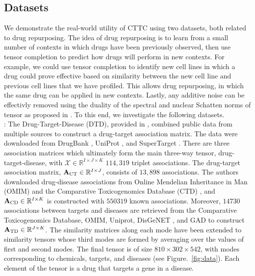 \documentclass{article}
\newcommand{\T}{\mathcal}
\newcommand{\m}[1]{{\bf{#1}}}
\newcommand{\mb}[1]{{\mathbb{#1}}}
\begin{document}
\subsection{Datasets}
We demonstrate the real-world utility of CTTC using two datasets, both related to drug repurposing. The idea of drug repurposing is to learn from a small number of contexts in which drugs have been previously observed, then use tensor completion to predict how drugs will perform in new contexts. For example, we could use tensor completion to identify new cell lines in which a drug could prove effective based on similarity between the new cell line and previous cell lines that we have profiled. This allows drug repurposing, in which the same drug can be applied in new contexts. Lastly, any additive noise can be effectivly removed using the duality of the spectral and nuclear Schatten norms of tensor as proposed in \cite{bagherian2024tensor}. To this end, we investigate the following datasets.\\
\noindent\textbf{}: The Drug-Target-Disease (DTD), provided in \cite{jamali2022ntd}, combined public data from multiple sources to construct a drug-target association matrix. The data were downloaded from DrugBank \cite{wishart2006drugbank}, UniProt \cite{uniprot2018uniprot}, and SuperTarget \cite{gunther2007supertarget}. There are three association matrices which ultimately form the main three-way tensor, drug-target-disease, with $\T X\in \mb R^{I\times J\times K}$
$114,319$ triplet associations. The drug-target association matrix, $\m A_{\text{CT}}\in \mathbb R^{I\times J}$, consists of $13,898$ associations. The authors downloaded drug-disease associations from Online Mendelian Inheritance in Man (OMIM) \cite{amberger2019omim} and the Comparative Toxicogenomics Database (CTD) \cite{davis2021comparative}, and $\m A_{\text{CD}}\in \mathbb R^{I\times K}$ is constructed with $550319$ known associations. Moreover, $14730$ associations between targets and diseases are retrieved from the Comparative Toxicogenomics Database, OMIM, Uniprot, DisGeNET \cite{pinero2020disgenet}, and GAD \cite{becker2004genetic} to construct $\m A_{\text{TD}}\in \mathbb R^{J\times K}$. 
The similarity matrices along each mode have been extended to similarity tensors whose third modes are formed by averaging over the values of first and second modes. The final tensor is of size  $810\times 302\times 542$, with modes corresponding to chemicals, targets, and diseases (see Figure.~\ref{fig:data}). Each element of the tensor is a drug that targets a gene in a disease.\\
\end{document}

